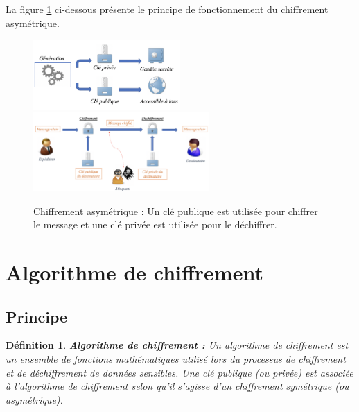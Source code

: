 \documentclass[oneside]{book}
\newtheorem{definition}{Définition}[section]
\begin{document}
\hspace{-0.5cm}La figure \ref{fig:asymétrique} ci-dessous présente le principe de fonctionnement du chiffrement asymétrique.

\begin{figure}[htbp]
    \centering
    \includegraphics[width=0.5\textwidth]{image/cle_asymetrique}
    \includegraphics[width=0.6\textwidth]{image/asymetrique}
    \caption{Chiffrement asymétrique : Un clé publique est utilisée pour chiffrer le message et une clé privée est utilisée pour le déchiffrer.}
    \label{fig:asymétrique}
\end{figure}

\newpage
\section{Algorithme de chiffrement}
\label{sec:Introduction}

\subsection{Principe}
\label{sec:Introduction}

\theoremstyle{definition}
\begin{definition}{\textbf{Algorithme de chiffrement :}}
Un algorithme de chiffrement est un ensemble de fonctions mathématiques utilisé lors du processus de chiffrement et de déchiffrement de données sensibles. Une clé publique (ou privée) est associée à l'algorithme de chiffrement selon qu'il s'agisse d'un chiffrement symétrique (ou asymétrique).
\end{definition}
\end{document}
